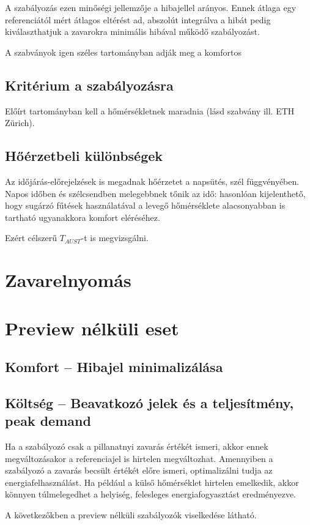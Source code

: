 A szabályozás ezen minőségi jellemzője a hibajellel arányos. Ennek átlaga egy referenciától mért átlagos eltérést ad, abszolút integrálva a hibát pedig kiválaszthatjuk a zavarokra minimális hibával működő szabályozást.

A szabványok igen széles tartományban adják meg a komfortos 

\subsection{Kritérium a szabályozásra}
Előírt tartományban kell a hőmérsékletnek maradnia (lásd szabvány ill. ETH Zürich).

\subsection{Hőérzetbeli különbségek}
Az időjárás-előrejelzések is megadnak hőérzetet a napsütés, szél függvényében.
Napos időben és szélcsendben melegebbnek tőnik az idő: hasonlóan kijelenthető, hogy sugárzó fűtések használatával a levegő hőmérséklete alacsonyabban is tartható ugyanakkora komfort eléréséhez.

Ezért célszerű $T_{AUST}$-t is megvizsgálni.

\section{Zavarelnyomás}

\section{Preview nélküli eset}

\subsection{Komfort -- Hibajel minimalizálása}
\subsection{Költség -- Beavatkozó jelek és a teljesítmény, peak demand}


Ha a szabályozó csak a pillanatnyi zavarás értékét ismeri, akkor ennek megváltozásakor a referenciajel is hirtelen megváltozhat. Amennyiben a szabályozó a zavarás becsült értékét előre ismeri, optimalizálni tudja az energiafelhasználást. Ha például a külső hőmérséklet hirtelen emelkedik, akkor könnyen túlmelegedhet a helyiség, felesleges energiafogyasztást eredményezve.

A következőkben a preview nélküli szabályozók viselkedése látható.



